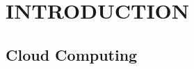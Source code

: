 \documentclass{sig-alternate-05-2015}
\begin{document}

\section{INTRODUCTION}

\subsection{Cloud Computing}
\end{document}
